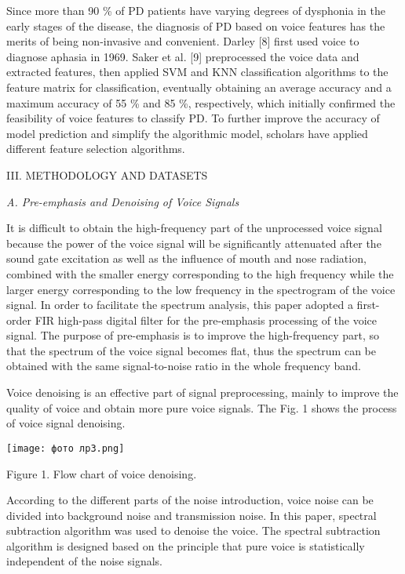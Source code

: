\documentclass{article}
\begin{document}
\begin{multicols*}{2}
Since more than 90 \% of PD patients have varying
degrees of dysphonia in the early stages of the disease,
the diagnosis of PD based on voice features has the
merits of being non-invasive and convenient. Darley [8]
first used voice to diagnose aphasia in 1969. Saker et al.
[9] preprocessed the voice data and extracted features,
then applied SVM and KNN classification algorithms to
the feature matrix for classification, eventually obtaining
an average accuracy and a maximum accuracy of 55 \%
and 85 \%, respectively, which initially confirmed the
feasibility of voice features to classify PD. To further
improve the accuracy of model prediction and simplify
the algorithmic model, scholars have applied different
feature selection algorithms.
\begin{center}
III. METHODOLOGY AND DATASETS
\end{center}
\textit{A. Pre-emphasis and Denoising of Voice Signals}

It is difficult to obtain the high-frequency part of
the unprocessed voice signal because the power of the
voice signal will be significantly attenuated after the
sound gate excitation as well as the influence of mouth
and nose radiation, combined with the smaller energy
corresponding to the high frequency while the larger
energy corresponding to the low frequency in the spectrogram of the voice signal. In order to facilitate the
spectrum analysis, this paper adopted a first-order FIR
high-pass digital filter for the pre-emphasis processing
of the voice signal. The purpose of pre-emphasis is to
improve the high-frequency part, so that the spectrum of
the voice signal becomes flat, thus the spectrum can be
obtained with the same signal-to-noise ratio in the whole
frequency band.

Voice denoising is an effective part of signal preprocessing, mainly to improve the quality of voice and
obtain more pure voice signals. The Fig. 1 shows the
process of voice signal denoising. 

\texttt{[image: фото лр3.png]} 
\begin{center}
Figure 1. Flow chart of voice denoising.
\end{center}
According to the different parts of the noise introduction, voice noise can be divided into background noise
and transmission noise. In this paper, spectral subtraction
algorithm was used to denoise the voice. The spectral
subtraction algorithm is designed based on the principle
that pure voice is statistically independent of the noise
signals.


\end{multicols*}
\end{document}

